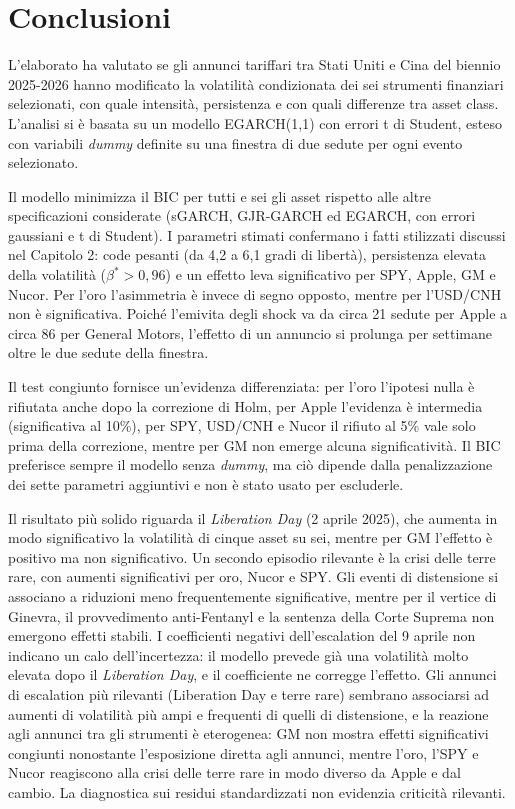 \chapter{Conclusioni}
\label{cap:conclusioni}

L'elaborato ha valutato se gli annunci tariffari tra Stati Uniti e Cina del biennio 2025-2026 hanno modificato la volatilità condizionata dei 
sei strumenti finanziari selezionati, con quale intensità, persistenza e con quali differenze tra asset class. L'analisi si è basata su un modello 
EGARCH(1,1) con errori t di Student, esteso con variabili \emph{dummy} definite su una finestra di due sedute per ogni evento selezionato.

Il modello minimizza il BIC per tutti e sei gli asset rispetto alle altre specificazioni considerate (sGARCH, GJR-GARCH ed EGARCH, con errori gaussiani e t di Student). 
I parametri stimati confermano i fatti stilizzati discussi nel Capitolo 2: code pesanti (da 4,2 a 6,1 gradi di libertà), persistenza elevata della volatilità ($\beta^* > 0,96$) 
e un effetto leva significativo per SPY, Apple, GM e Nucor. Per l'oro l'asimmetria è invece di segno opposto, mentre per l'USD/CNH non è significativa. Poiché l'emivita degli shock va da 
circa 21 sedute per Apple a circa 86 per General Motors, l'effetto di un annuncio si prolunga per settimane oltre le due sedute della finestra.

Il test congiunto fornisce un'evidenza differenziata: per l'oro l'ipotesi nulla è rifiutata anche dopo la correzione di Holm, per Apple 
l'evidenza è intermedia (significativa al 10\%), per SPY, USD/CNH e Nucor il rifiuto al 5\% vale solo prima della correzione, 
mentre per GM non emerge alcuna significatività. Il BIC preferisce sempre il modello senza \emph{dummy}, ma ciò dipende dalla penalizzazione 
dei sette parametri aggiuntivi e non è stato usato per escluderle.

Il risultato più solido riguarda il \emph{Liberation Day} (2 aprile 2025), che aumenta in modo significativo la volatilità di cinque asset 
su sei, mentre per GM l'effetto è positivo ma non significativo. Un secondo episodio rilevante è la crisi delle terre rare, con aumenti 
significativi per oro, Nucor e SPY. Gli eventi di distensione si associano a riduzioni meno frequentemente significative, mentre per 
il vertice di Ginevra, il provvedimento anti-Fentanyl e la sentenza della Corte Suprema non emergono effetti stabili. I coefficienti negativi 
dell'escalation del 9 aprile non indicano un calo dell'incertezza: il modello prevede già una volatilità molto elevata dopo il \emph{Liberation Day}, e il 
coefficiente ne corregge l'effetto. Gli annunci di escalation più rilevanti (Liberation Day e terre rare) sembrano associarsi ad aumenti di volatilità più ampi e 
frequenti di quelli di distensione, e la reazione agli annunci tra gli strumenti è eterogenea: GM non mostra effetti significativi congiunti nonostante l'esposizione 
diretta agli annunci, mentre l'oro, l'SPY e Nucor reagiscono alla crisi delle terre rare in modo diverso da Apple e dal cambio. La diagnostica sui 
residui standardizzati non evidenzia criticità rilevanti.

